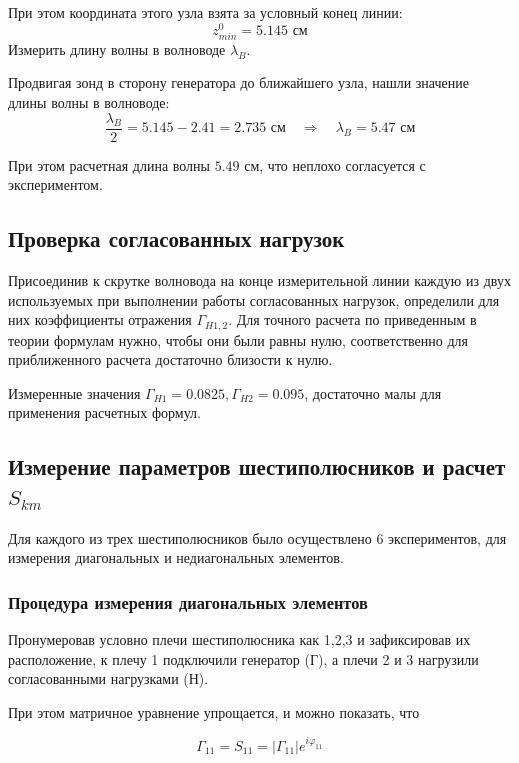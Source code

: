 \documentclass[a4paper,12pt]{article}
\begin{document}
При этом координата этого узла взята за условный конец линии: 
\begin{equation}
 	z^0_{min}=5.145\text{ см}
 \end{equation}
Измерить длину волны в волноводе $\lambda_B$.

Продвигая зонд в сторону генератора до ближайшего узла, нашли значение длины волны в волноводе:
\begin{equation}
	\frac{\lambda_B}{2}=5.145-2.41=2.735\text{ см}
	\quad\Rightarrow\quad \lambda_B=5.47\text{ см}
\end{equation}

При этом расчетная длина волны $5.49$ см, что неплохо согласуется с экспериментом.

\subsection{Проверка согласованных нагрузок}

Присоединив к скрутке волновода на конце измерительной линии каждую из двух используемых при выполнении работы согласованных нагрузок, определили для них коэффициенты отражения $\Gamma_{H1,2}$. Для точного расчета по приведенным в теории формулам нужно, чтобы они были равны нулю, соответственно для приближенного расчета достаточно близости к нулю. 

Измеренные значения $\Gamma_{H1}=0.0825,\Gamma_{H2}=0.095$, достаточно малы для применения расчетных формул.

\subsection{Измерение параметров шестиполюсников и расчет $S_{km}$}

Для каждого из трех шестиполюсников было осуществлено 6 экспериментов, для измерения диагональных и недиагональных элементов.

\subsubsection{Процедура измерения диагональных элементов}
Пронумеровав условно плечи шестиполюсника как 1,2,3 и зафиксировав их расположение, 
к плечу 1 подключили генератор (Г), а плечи 2 и 3 нагрузили согласованными нагрузками (Н). 

При этом матричное уравнение упрощается, и можно показать, что

\begin{equation}
	\Gamma _ { 11 } = S _ { 11 } = \left| \Gamma _ { 11 } \right| e ^ { i \varphi _ { 11 } }
\end{equation}
\end{document}
